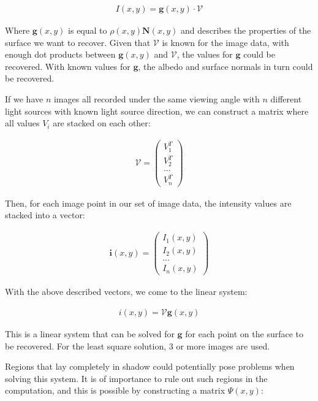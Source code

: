 	\begin{eqnarray*}
		I(x,y) =  \textbf{g}(x,y) \cdot \mathcal{V}
	\end{eqnarray*}

\noindent Where $\textbf{g}(x,y)$ is equal to $\rho(x,y)\textbf{N}(x,y)$ and describes the properties of the surface we want to recover. Given that $\mathcal{V}$ is known for the image data, with enough dot products between $\textbf{g}(x,y)$ and $\mathcal{V}$, the values for $\textbf{g}$ could be recovered. With known values for $\textbf{g}$, the albedo and surface normals in turn could be recovered.

If we have $n$ images all recorded under the same viewing angle with $n$ different light sources with known light source direction, we can construct a matrix where all values $V_i$ are stacked on each other:

	\begin{eqnarray*}
		\mathcal{V} = \begin{pmatrix} V_1^T \\ V_2^T \\ ... \\ V_n^T \end{pmatrix}
	\end{eqnarray*}

\noindent Then, for each image point in our set of image data, the intensity values are stacked into a vector:

	\begin{eqnarray*}
		\textbf{i}(x,y) = \begin{pmatrix} I_1(x,y) \\ I_2(x,y) \\ ... \\ I_n(x,y) \end{pmatrix}
	\end{eqnarray*}

\noindent With the above described vectors, we come to the linear system:

	\begin{eqnarray*}
		i(x,y) = \mathcal{V}\textbf{g}(x,y)
	\end{eqnarray*}

\noindent This is a linear system that can be solved for $\textbf{g}$ for each point on the surface to be recovered. For the least square solution, 3 or more images are used.

Regions that lay completely in shadow could potentially pose problems when solving this system. It is of importance to rule out such regions in the computation, and this is possible by constructing a matrix $\Psi(x,y)$:

